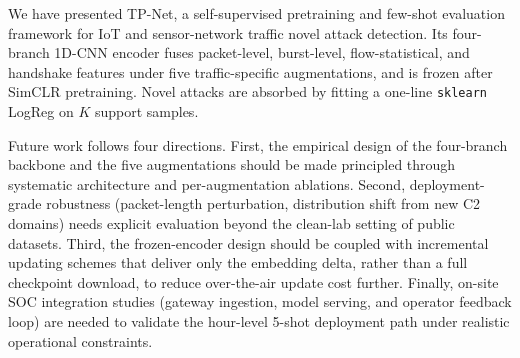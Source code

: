 \documentclass[sensors,article,submit,moreauthors]{Definitions/mdpi}
\begin{document}
We have presented TP-Net, a self-supervised pretraining and few-shot evaluation framework for IoT and sensor-network traffic novel attack detection. Its four-branch 1D-CNN encoder fuses packet-level, burst-level, flow-statistical, and handshake features under five traffic-specific augmentations, and is frozen after SimCLR pretraining. Novel attacks are absorbed by fitting a one-line \texttt{sklearn} LogReg on $K$ support samples.

Future work follows four directions. First, the empirical design of the four-branch backbone and the five augmentations should be made principled through systematic architecture and per-augmentation ablations. Second, deployment-grade robustness (packet-length perturbation, distribution shift from new C2 domains) needs explicit evaluation beyond the clean-lab setting of public datasets. Third, the frozen-encoder design should be coupled with incremental updating schemes that deliver only the embedding delta, rather than a full checkpoint download, to reduce over-the-air update cost further. Finally, on-site SOC integration studies (gateway ingestion, model serving, and operator feedback loop) are needed to validate the hour-level 5-shot deployment path under realistic operational constraints.




\end{document}
